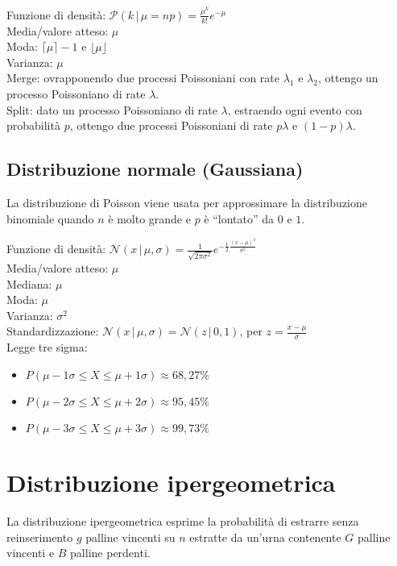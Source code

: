 \documentclass[10pt,landscape]{article}
\begin{document}
\begin{multicols}{3}
\vspace{1em}

Funzione di densità: $\mathcal{P}(k \, | \, \mu = np) = \frac{\mu ^{k}}{k!} e^{-\mu}$ \\
Media/valore atteso: $\mu$ \\
Moda: $\lceil \mu \rceil -1$ e $\lfloor \mu \rfloor$ \\
Varianza: $\mu$ \\
Merge: ovrapponendo due processi Poissoniani con rate $\lambda_1$ e $\lambda_2$, ottengo un processo Poissoniano di rate $\lambda$. \\
Split: dato un processo Poissoniano di rate $\lambda$, estraendo ogni evento con probabilità $p$, ottengo due processi Poissoniani di rate $p\lambda$ e $(1 - p)\lambda$. \\

\subsection{Distribuzione normale (Gaussiana)}
La distribuzione di Poisson viene usata per approssimare la distribuzione binomiale quando $n$ è molto grande e $p$ è ``lontato'' da $0$ e $1$.

\vspace{1em}

Funzione di densità: $\mathcal{N}(x \, | \, \mu, \sigma) = \frac{1}{\sqrt{2\pi \sigma ^{2}}} e^{-{\frac{1}{2}}\frac{(x - \mu)^2}{\sigma^2}}$ \\
Media/valore atteso: $\mu$ \\
Mediana: $\mu$ \\
Moda: $\mu$ \\
Varianza: $\sigma^2$ \\
Standardizzazione: $\mathcal{N}(x \, | \, \mu, \sigma) = \mathcal{N}(z \, | \, 0, 1)$, per $z = \frac{x - \mu}{\sigma}$ \\
Legge tre sigma:
\begin{itemize}
	\item $P(\mu - 1\sigma \le X \le \mu + 1\sigma) \approx 68,27\%$
	\item $P(\mu - 2\sigma \le X \le \mu + 2\sigma) \approx 95,45\%$
	\item $P(\mu - 3\sigma \le X \le \mu + 3\sigma) \approx 99,73\%$
\end{itemize}

\section{Distribuzione ipergeometrica}
La distribuzione ipergeometrica esprime la probabilità di estrarre senza reinserimento $g$ palline vincenti su $n$ estratte da un'urna contenente $G$ palline vincenti e $B$ palline perdenti.


\end{multicols}
\end{document}
